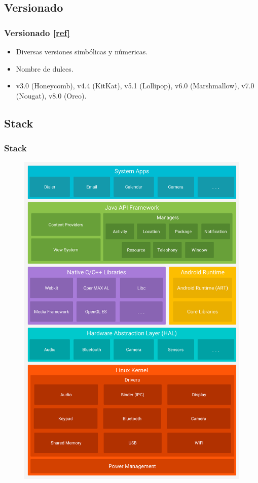 \subsection{Versionado}
\begin{frame}
  \frametitle{Versionado \href{https://es.wikipedia.org/wiki/Anexo:Historial\_de\_versiones\_de\_Android}{[ref]}}
  \begin{itemize}
    \item Diversas versiones simbólicas y númericas.
    
    \item Nombre de dulces.
    
    \item v3.0 (Honeycomb), v4.4 (KitKat), v5.1 (Lollipop), v6.0 (Marshmallow), v7.0 (Nougat), v8.0 (Oreo).
  \end{itemize}
\end{frame}

\subsection{Stack}
\begin{frame}
  \frametitle{Stack}
  \begin{figure}
      \includegraphics[scale=0.1]{images/stack2.png}
  \end{figure}
\end{frame}

